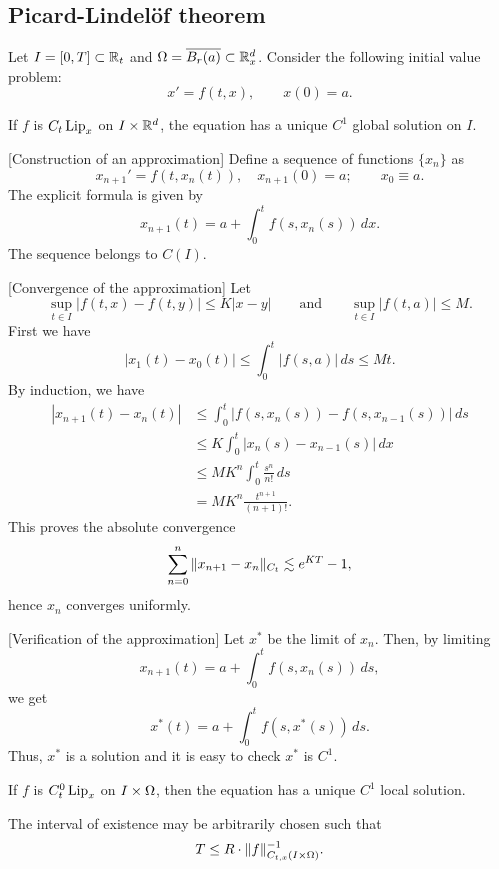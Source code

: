 \documentclass[11pt]{article}
\begin{document}
\subsection{Picard-Lindel\"of theorem}
Let $I=[0,T]\subset\mathbb{R}_t$ and $\Omega=\overline{B_r(a)}\subset\mathbb{R}_x^d$.
Consider the following initial value problem:
\[x'=f(t,x),\qquad x(0)=a.\]
\begin{thm}[Global existence, $\Omega=\R^d$]
If $f$ is $C_t\operatorname{Lip}_x$ on $I\times\mathbb{R}^d$, the equation has a unique $C^1$ global solution on $I$.
\end{thm}
\begin{pf}
[Construction of an approximation]
Define a sequence of functions $\{x_n\}$ as
\[x_{n+1}'=f(t,x_n(t)),\quad x_{n+1}(0)=a;\qquad x_0\equiv a.\]
The explicit formula is given by
\[x_{n+1}(t)=a+\int_0^tf(s,x_n(s))\,dx.\]
The sequence belongs to $C(I)$.

[Convergence of the approximation]
Let
\[\sup_{t\in I}|f(t,x)-f(t,y)|\le K|x-y|\qquad\text{and}\qquad\sup_{t\in I}|f(t,a)|\le M.\]
First we have
\[|x_1(t)-x_0(t)|\le\int_0^t|f(s,a)|\,ds\le Mt.\]
By induction, we have
\begin{align*}
|x_{n+1}(t)-x_n(t)|
&\le\int_0^t|f(s,x_n(s))-f(s,x_{n-1}(s))|\,ds\\
&\le K\int_0^t|x_n(s)-x_{n-1}(s)|\,dx\\
&\le MK^n\int_0^t\frac{s^n}{n!}\,ds\\
&=MK^n\frac{t^{n+1}}{(n+1)!}.
\end{align*}
This proves the absolute convergence
\[\sum_{n=0}^n\|x_{n+1}-x_n\|_{C_t}\lesssim e^{KT}-1,\]
hence $x_n$ converges uniformly.

[Verification of the approximation]
Let $x^*$ be the limit of $x_n$.
Then, by limiting
\[x_{n+1}(t)=a+\int_0^tf(s,x_n(s))\,ds,\]
we get
\[x^*(t)=a+\int_0^tf(s,x^*(s))\,ds.\]
Thus, $x^*$ is a solution and it is easy to check $x^*$ is $C^1$.
\end{pf}

\begin{thm}
If $f$ is $C_t^0\operatorname{Lip}_x$ on $I\times\Omega$, then the equation has a unique $C^1$ local solution.

The interval of existence may be arbitrarily chosen such that
\[T\le R\cdot\|f\|_{C_{t,x}(I\times\Omega)}^{-1}.\]
\end{thm}
\end{document}

